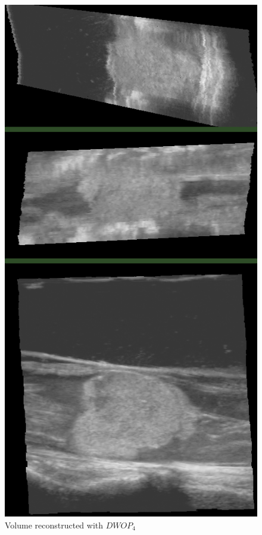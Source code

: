 \begin{figure}
\begin{minipage}[b]{0.326\textwidth}
	\centering
	\includegraphics[width=\textwidth]{graphics/large_dwop4.png}
	\caption{Volume reconstructed with $DWOP_4$}

\end{minipage}
\end{figure}
